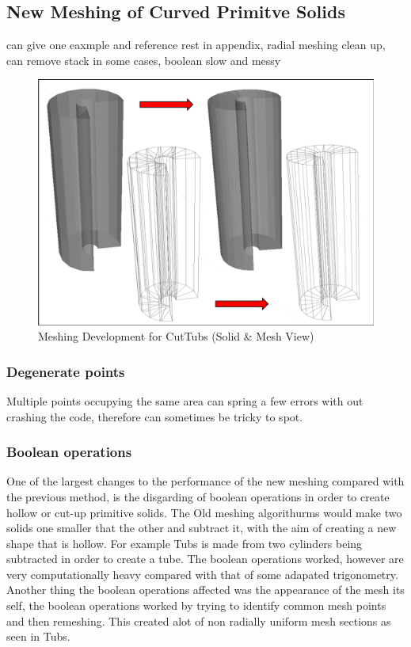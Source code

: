 \documentclass[12pt,a4paper]{article}
\begin{document}
\subsection{New Meshing of Curved Primitve Solids}
can give one eaxmple and reference rest in appendix, radial meshing clean up, can remove stack in some cases, boolean slow and messy
\begin{figure}[h!]
\centering
\includegraphics[scale=0.5]{Images//Meshes//tubs.png}
\caption[width=\columnwidth]{Meshing Development for CutTubs (Solid \& Mesh View)}
\label{conts}
\end{figure}



\subsubsection{Degenerate points}
Multiple points occupying the same area can spring a few errors with out crashing the code, therefore can sometimes be tricky to spot. 

\subsubsection{Boolean operations}
\label{bool}
One of the largest changes to the performance of the new meshing compared with the previous method, is the disgarding of boolean operations in order to create hollow or cut-up primitive solids. The Old meshing algorithurms would make two solids one smaller that the other and subtract it, with the aim of creating a new shape that is hollow. For example Tubs is made from two cylinders being subtracted in order to create a tube. The boolean operations worked, however are very computationally heavy compared with that of some adapated trigonometry. Another thing the boolean operations affected was the appearance of the mesh its self, the boolean operations worked by trying to identify common mesh points and then remeshing. This created alot of non radially uniform mesh sections as seen in Tubs.
\end{document}
